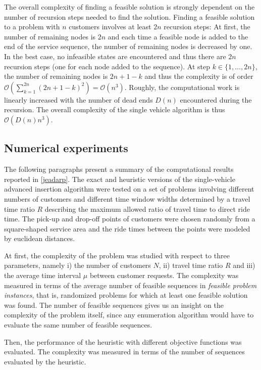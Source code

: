 \documentclass[dissertation,draft*]{aaltoseries}
\begin{document}
The overall complexity of finding a feasible solution is strongly dependent on the number of recursion
steps needed to find the solution. 
Finding a feasible solution to a problem with $n$ customers involves at least $2n$
recursion steps: At first, the number of remaining nodes is $2n$ and each time 
a feasible node is added to the end of the service sequence, the 
number of remaining nodes is decreased by one.
In the best case, no infeasible states are encountered and thus there are $2n$ recursion steps 
(one for each node added to the sequence).
At step $k \in \{1,\ldots,2n\}$, the number of remaining nodes is $2n+1-k$
and thus the complexity is of order $\mathcal{O} (\sum_{k=1}^{2n} (2n+1-k)^2) =\mathcal{O}(n^3)$.
Roughly, the computational work is linearly increased with the 
number of dead ends $D(n)$ encountered during the recursion.
The overall complexity of the single vehicle algorithm is thus $\mathcal{O}(D(n)n^3)$.


\subsection{Numerical experiments}
\label{svexperience}
The following paragraphs present a summary of the computational results reported in \ref{jeadarp}. 
The exact and heuristic versions of the single-vehicle advanced insertion algorithm
were tested on a set of problems involving different numbers of customers and different time
window widths determined by a travel time ratio $R$ describing the maximum allowed ratio of travel time
to direct ride time. The pick-up and drop-off points of customers were chosen randomly from a
square-shaped service area and the ride times between the points were modeled by euclidean distances.

At first, the complexity of the problem was studied with respect to three parameters, namely
i) the number of customers $N$, ii) travel time ratio $R$ and iii) the average time interval $\mu$
between customer requests. The complexity was measured in terms of the
average number of feasible sequences
in \emph{feasible problem instances}, that is, randomized
problems for which at least one feasible solution was found. 
The number of feasible sequences gives us an insight on the complexity of the problem itself,
since any enumeration algorithm would have to evaluate the same number of feasible sequences.

Then, the performance of the heuristic with different objective functions was evaluated.
The complexity was measured in terms of the number of sequences evaluated by the heuristic.
\end{document}
